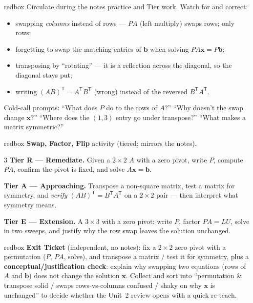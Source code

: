 \documentclass[10pt]{article}
\newcommand{\xx}{\mathbf{x}}
\newcommand{\bb}{\mathbf{b}}
\newcommand{\PP}{P}
\newcommand{\tp}{\mathsf{T}}
\begin{document}
\begin{skillbox}{redbox}
Circulate during the notes practice and Tier work. Watch for and correct:
\begin{itemize}[leftmargin=1.2em, nosep]
  \item swapping \emph{columns} instead of rows --- $\PP A$ (left multiply) swaps rows; only rows;
  \item forgetting to swap the matching entries of $\bb$ when solving $\PP A\xx=\PP\bb$;
  \item transposing by ``rotating'' --- it is a reflection across the diagonal, so the diagonal stays put;
  \item writing $(AB)^{\tp}=A^{\tp}B^{\tp}$ (wrong) instead of the reversed $B^{\tp}A^{\tp}$.
\end{itemize}
Cold-call prompts: ``What does $\PP$ do to the rows of $A$?'' ``Why doesn't the swap change $\xx$?''
``Where does the $(1,3)$ entry go under transpose?'' ``What makes a matrix symmetric?''
\end{skillbox}

\begin{skillbox}{redbox}
\textbf{Swap, Factor, Flip} activity (tiered; mirrors the notes).
\begin{multicols}{3}
\textbf{Tier R --- Remediate.} Given a $2\times2$ $A$ with a zero pivot, write $\PP$, compute $\PP A$,
confirm the pivot is fixed, and solve $A\xx=\bb$.

\columnbreak
\textbf{Tier A --- Approaching.} Transpose a non-square matrix, test a matrix for symmetry, and
\emph{verify} $(AB)^{\tp}=B^{\tp}A^{\tp}$ on a $2\times2$ pair --- then interpret what symmetry means.

\columnbreak
\textbf{Tier E --- Extension.} A $3\times3$ with a zero pivot: write $\PP$, factor $\PP A=LU$, solve in
two sweeps, and justify why the row swap leaves the solution unchanged.
\end{multicols}
\end{skillbox}

\begin{skillbox}{redbox}
\textbf{Exit Ticket} (independent, no notes): fix a $2\times2$ zero pivot with a permutation ($\PP$,
$\PP A$, solve), and transpose a matrix / test it for symmetry, plus a \textbf{conceptual/justification
check}: explain why swapping two equations (rows of $A$ and $\bb$) does not change the solution $\xx$.
Collect and sort into ``permutation \& transpose solid / swaps rows-vs-columns confused / shaky on why
$\xx$ is unchanged'' to decide whether the Unit~2 review opens with a quick re-teach.
\end{skillbox}
\end{document}
